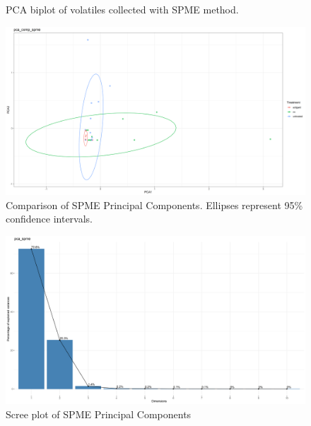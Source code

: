 \documentclass[12pt,final,CPage]{ufthesis}
\begin{document}
{\begin{figure}
{  }

  \caption{PCA biplot of volatiles collected with SPME method.}\label{fig:spme-vocs}
  \end{figure}
  \begin{figure}

  {\centering \includegraphics[width=1\linewidth]{figure/rrv_volatiles_comparison_pca_comp_spme} 

  }

  \caption{Comparison of SPME Principal Components. Ellipses represent 95\% confidence intervals.}\label{fig:spme-vocs-compares}
  \end{figure}
  \begin{figure}

  {\centering \includegraphics[width=1\linewidth]{figure/rrv_volatiles_screeplot_pca_spme} 

  }

  \caption{Scree plot of SPME Principal Components}\label{fig:spme-vocs-scree}
  \end{figure}
  \begin{figure}


\end{figure}}
\end{document}
